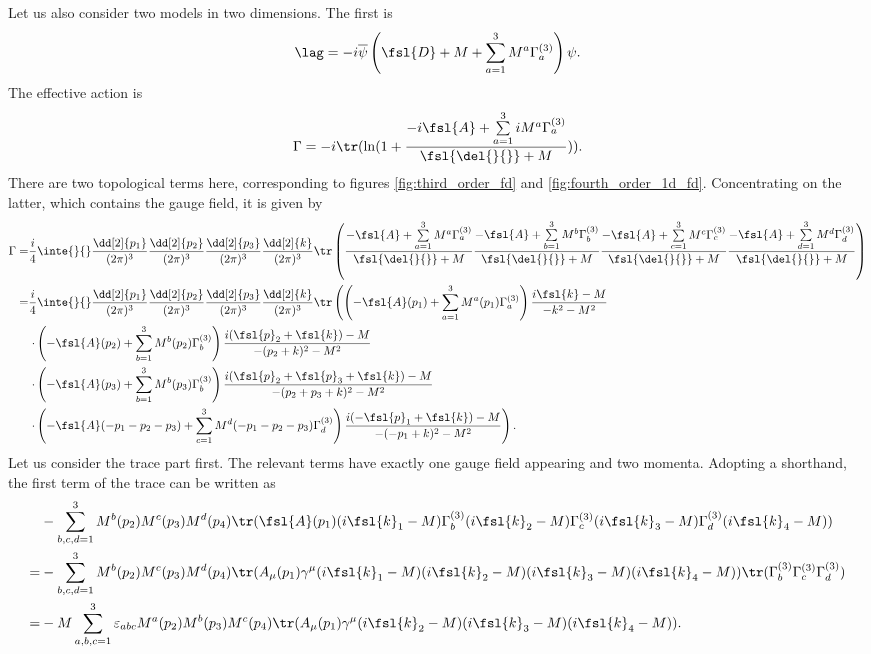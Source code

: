 Let us also consider two models in two dimensions. The first is
\begin{align*}
	\lag = -i\overline{\psi}\left(\fsl{D} + M + \sum\limits_{a = 1}^{3}M^{a}\Gamma_{a}^{(3)}\right)\psi.
\end{align*}
The effective action is
\begin{align*}
	\Gamma = -i\tr(\ln(1 + \frac{-i\fsl{A} + \sum\limits_{a = 1}^{3}iM^{a}\Gamma_{a}^{(3)}}{\fsl{\del{}{}} + M})).
\end{align*}
There are two topological terms here, corresponding to figures \ref{fig:third_order_fd} and \ref{fig:fourth_order_1d_fd}. Concentrating on the latter, which contains the gauge field, it is given by
\begin{align*}
	\Gamma =& \frac{i}{4}\inte{}{}\frac{\dd[2]{p_{1}}}{(2\pi)^{3}}\frac{\dd[2]{p_{2}}}{(2\pi)^{3}}\frac{\dd[2]{p_{3}}}{(2\pi)^{3}}\frac{\dd[2]{k}}{(2\pi)^{3}}\tr\left(\frac{-\fsl{A} + \sum\limits_{a = 1}^{3}M^{a}\Gamma_{a}^{(3)}}{\fsl{\del{}{}} + M}\frac{-\fsl{A} + \sum\limits_{b = 1}^{3}M^{b}\Gamma_{b}^{(3)}}{\fsl{\del{}{}} + M}\frac{-\fsl{A} + \sum\limits_{c = 1}^{3}M^{c}\Gamma_{c}^{(3)}}{\fsl{\del{}{}} + M}\frac{-\fsl{A} + \sum\limits_{d = 1}^{3}M^{d}\Gamma_{d}^{(3)}}{\fsl{\del{}{}} + M}\right) \\
	=& \frac{i}{4}\inte{}{}\frac{\dd[2]{p_{1}}}{(2\pi)^{3}}\frac{\dd[2]{p_{2}}}{(2\pi)^{3}}\frac{\dd[2]{p_{3}}}{(2\pi)^{3}}\frac{\dd[2]{k}}{(2\pi)^{3}}\tr\left(\left(-\fsl{A}(p_{1}) + \sum\limits_{a = 1}^{3}M^{a}(p_{1})\Gamma_{a}^{(3)}\right)\frac{i\fsl{k} - M}{-k^{2} - M^{2}}\right. \\
	 &\left.\cdot\left(-\fsl{A}(p_{2}) + \sum\limits_{b = 1}^{3}M^{b}(p_{2})\Gamma_{b}^{(3)}\right)\frac{i(\fsl{p}_{2} + \fsl{k}) - M}{-(p_{2} + k)^{2} - M^{2}}\right. \\
	 &\left.\cdot\left(-\fsl{A}(p_{3}) + \sum\limits_{b = 1}^{3}M^{b}(p_{3})\Gamma_{b}^{(3)}\right)\frac{i(\fsl{p}_{2} + \fsl{p}_{3} + \fsl{k}) - M}{-(p_{2} + p_{3} + k)^{2} - M^{2}}\right. \\
	 &\left.\cdot\left(-\fsl{A}(-p_{1} - p_{2} - p_{3}) + \sum\limits_{c = 1}^{3}M^{d}(-p_{1} - p_{2} - p_{3})\Gamma_{d}^{(3)}\right)\frac{i(-\fsl{p}_{1} + \fsl{k}) - M}{-(-p_{1} + k)^{2} - M^{2}}\right).
\end{align*}
Let us consider the trace part first. The relevant terms have exactly one gauge field appearing and two momenta. Adopting a shorthand, the first term of the trace can be written as
\begin{align*}
	 &-\sum\limits_{b, c, d = 1}^{3}M^{b}(p_{2})M^{c}(p_{3})M^{d}(p_{4})\tr(\fsl{A}(p_{1})(i\fsl{k}_{1} - M)\Gamma_{b}^{(3)}(i\fsl{k}_{2} - M)\Gamma_{c}^{(3)}(i\fsl{k}_{3} - M)\Gamma_{d}^{(3)}(i\fsl{k}_{4} - M)) \\
	=& -\sum\limits_{b, c, d = 1}^{3}M^{b}(p_{2})M^{c}(p_{3})M^{d}(p_{4})\tr(A_{\mu}(p_{1})\gamma^{\mu}(i\fsl{k}_{1} - M)(i\fsl{k}_{2} - M)(i\fsl{k}_{3} - M)(i\fsl{k}_{4} - M))\tr(\Gamma_{b}^{(3)}\Gamma_{c}^{(3)}\Gamma_{d}^{(3)}) \\
	=& -M\sum\limits_{a, b, c = 1}^{3}\varepsilon_{abc}M^{a}(p_{2})M^{b}(p_{3})M^{c}(p_{4})\tr(A_{\mu}(p_{1})\gamma^{\mu}(i\fsl{k}_{2} - M)(i\fsl{k}_{3} - M)(i\fsl{k}_{4} - M)).
\end{align*}
